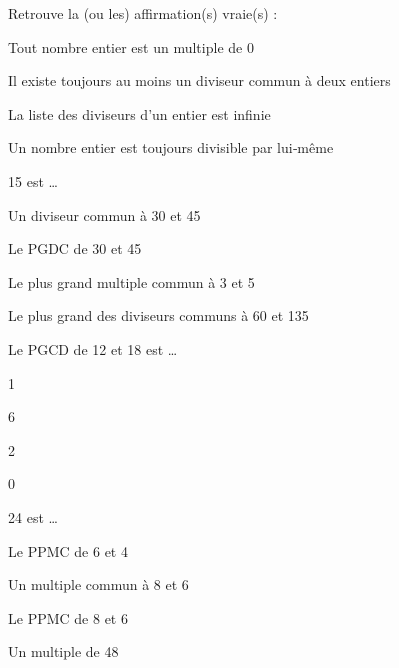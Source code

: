 \begin{QCM}
\begin{GroupeQCM}
    \begin{exercice}
      Retrouve la (ou les) affirmation(s) vraie(s) :
      \begin{ChoixQCM}{4}
      \item Tout nombre entier est un multiple de 0
      \item Il existe toujours au moins un diviseur commun à deux entiers
      \item La liste des diviseurs d'un entier est infinie
      \item Un nombre entier est toujours divisible par lui‑même
      \end{ChoixQCM}
\begin{corrige}
   \end{corrige}
    \end{exercice}
    
    \begin{exercice}
      15 est \ldots
      \begin{ChoixQCM}{4}
      \item Un diviseur commun à 30 et 45
      \item Le PGDC de 30 et 45
      \item Le plus grand multiple commun à 3 et 5
      \item Le plus grand des diviseurs communs à 60 et 135
      \end{ChoixQCM}
\begin{corrige}
   \end{corrige}
    \end{exercice}
    
    \begin{exercice}
      Le PGCD de 12 et 18 est \ldots
      \begin{ChoixQCM}{4}
      \item 1
      \item 6
      \item 2
      \item 0
      \end{ChoixQCM}
\begin{corrige}
   \end{corrige}
    \end{exercice}

    \begin{exercice}
      24 est \ldots
      \begin{ChoixQCM}{4}
      \item Le PPMC de 6 et 4
      \item Un multiple commun à 8 et 6 
      \item Le PPMC de 8 et 6
      \item Un multiple de 48
      \end{ChoixQCM}
\begin{corrige}
   \end{corrige}
    \end{exercice}
   
\end{GroupeQCM}
\end{QCM}

